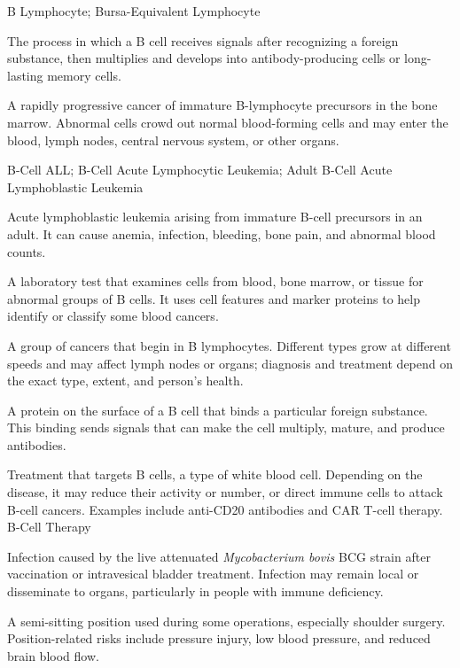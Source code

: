 \synonyms
B Lymphocyte; Bursa-Equivalent Lymphocyte

 The process in which a B cell receives signals after recognizing a foreign substance, then multiplies and develops into antibody-producing cells or long-lasting memory cells.

 A rapidly progressive cancer of immature B-lymphocyte precursors in the bone marrow. Abnormal cells crowd out normal blood-forming cells and may enter the blood, lymph nodes, central nervous system, or other organs.

\synonyms
B-Cell ALL; B-Cell Acute Lymphocytic Leukemia; Adult B-Cell Acute Lymphoblastic Leukemia

 Acute lymphoblastic leukemia arising from immature B-cell precursors in an adult. It can cause anemia, infection, bleeding, bone pain, and abnormal blood counts.

 A laboratory test that examines cells from blood, bone marrow, or tissue for abnormal groups of B cells. It uses cell features and marker proteins to help identify or classify some blood cancers.

 A group of cancers that begin in B lymphocytes. Different types grow at different speeds and may affect lymph nodes or organs; diagnosis and treatment depend on the exact type, extent, and person's health.

 A protein on the surface of a B cell that binds a particular foreign substance. This binding sends signals that can make the cell multiply, mature, and produce antibodies.

 Treatment that targets B cells, a type of white blood cell. Depending on the disease, it may reduce their activity or number, or direct immune cells to attack B-cell cancers. Examples include anti-CD20 antibodies and CAR T-cell therapy.
\synonyms
B-Cell Therapy

 Infection caused by the live attenuated \textit{Mycobacterium
bovis} BCG strain after vaccination or intravesical bladder treatment. Infection
may remain local or disseminate to organs, particularly in people with immune
deficiency.

 A semi-sitting position used during some operations, especially shoulder surgery. Position-related risks include pressure injury, low blood pressure, and reduced brain blood flow.

